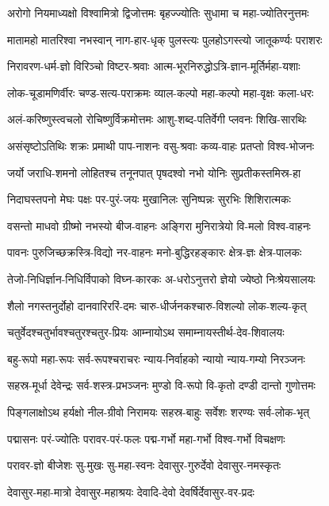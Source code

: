 \twolineshloka
{अरोगो नियमाध्यक्षो विश्वामित्रो द्विजोत्तमः}
{बृहज्ज्योतिः सुधामा च महा-ज्योतिरनुत्तमः}

\twolineshloka
{मातामहो मातरिश्वा नभस्वान् नाग-हार-धृक्}
{पुलस्त्यः पुलहोऽगस्त्यो जातूकर्ण्यः पराशरः}

\twolineshloka
{निरावरण-धर्म-ज्ञो विरिञ्चो विष्टर-श्रवाः}
{आत्म-भूरनिरुद्धोऽत्रि-ज्ञान-मूर्तिर्महा-यशाः}

\twolineshloka
{लोक-चूडामणिर्वीरः चण्ड-सत्य-पराक्रमः}
{व्याल-कल्पो महा-कल्पो महा-वृक्षः कला-धरः}

\twolineshloka
{अलं-करिष्णुस्त्वचलो रोचिष्णुर्विक्रमोत्तमः}
{आशु-शब्द-पतिर्वेगी प्लवनः शिखि-सारथिः}

\twolineshloka
{असंसृष्टोऽतिथिः शक्रः प्रमाथी पाप-नाशनः}
{वसु-श्रवाः कव्य-वाहः प्रतप्तो विश्व-भोजनः}

\twolineshloka
{जर्यो जराधि-शमनो लोहितश्च तनूनपात्}
{पृषदश्वो नभो योनिः सुप्रतीकस्तमिस्र-हा}

\twolineshloka
{निदाघस्तपनो मेघः पक्षः पर-पुरं-जयः}
{मुखानिलः सुनिष्पन्नः सुरभिः शिशिरात्मकः}

\twolineshloka
{वसन्तो माधवो ग्रीष्मो नभस्यो बीज-वाहनः}
{अङ्गिरा मुनिरात्रेयो वि-मलो विश्व-वाहनः}

\twolineshloka
{पावनः पुरुजिच्छक्रस्त्रि-विद्यो नर-वाहनः}
{मनो-बुद्धिरहङ्कारः क्षेत्र-ज्ञः क्षेत्र-पालकः}

\twolineshloka
{तेजो-निधिर्ज्ञान-निधिर्विपाको विघ्न-कारकः}
{अ-धरोऽनुत्तरो ज्ञेयो ज्येष्ठो निःश्रेयसालयः}

\twolineshloka
{शैलो नगस्तनुर्दोहो दानवारिररिं-दमः}
{चारु-धीर्जनकश्चारु-विशल्यो लोक-शल्य-कृत्}

\twolineshloka
{चतुर्वेदश्चतुर्भावश्चतुरश्चतुर-प्रियः}
{आम्नायोऽथ समाम्नायस्तीर्थ-देव-शिवालयः}

\twolineshloka
{बहु-रूपो महा-रूपः सर्व-रूपश्चराचरः}
{न्याय-निर्वाहको न्यायो न्याय-गम्यो निरञ्जनः}

\twolineshloka
{सहस्र-मूर्धा देवेन्द्रः सर्व-शस्त्र-प्रभञ्जनः}
{मुण्डो वि-रूपो वि-कृतो दण्डी दान्तो गुणोत्तमः}

\twolineshloka
{पिङ्गलाक्षोऽथ हर्यक्षो नील-ग्रीवो निरामयः}
{सहस्र-बाहुः सर्वेशः शरण्यः सर्व-लोक-भृत्}

\twolineshloka
{पद्मासनः परं-ज्योतिः परावर-परं-फलः}
{पद्म-गर्भो महा-गर्भो विश्व-गर्भो विचक्षणः}

\twolineshloka
{परावर-ज्ञो बीजेशः सु-मुखः सु-महा-स्वनः}
{देवासुर-गुरुर्देवो देवासुर-नमस्कृतः}

\twolineshloka
{देवासुर-महा-मात्रो देवासुर-महाश्रयः}
{देवादि-देवो देवर्षिर्देवासुर-वर-प्रदः}

